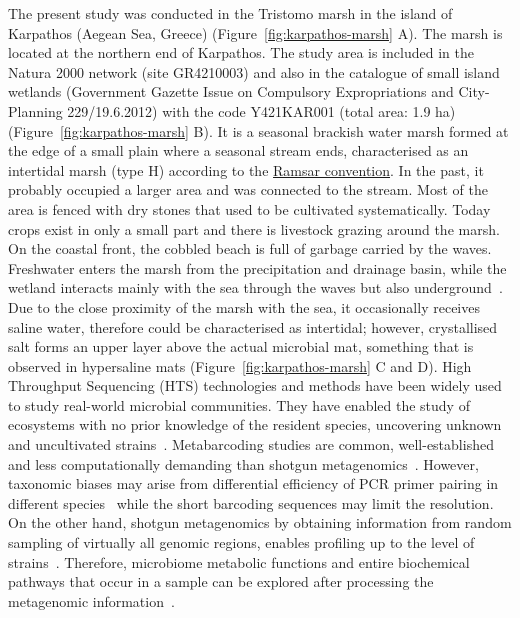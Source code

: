    The present study was conducted in the Tristomo marsh in the island of Karpathos (Aegean Sea, Greece) (Figure~\ref{fig:karpathos-marsh} A). 
   The marsh is located at the northern end of Karpathos. 
   The study area is included in the Natura 2000 network (site GR4210003) and also in the catalogue of small island wetlands 
   (Government Gazette Issue on Compulsory Expropriations and City-Planning 229/19.6.2012) with the code Y421KAR001 (total area: 1.9 ha) (Figure~\ref{fig:karpathos-marsh} B). 
   It is a seasonal brackish water marsh formed at the edge of a small plain where a seasonal stream ends, 
   characterised as an intertidal marsh (type H) according to the \href{https://www.ramsar.org/about/the-convention-on-wetlands-and-its-mission}{Ramsar convention}. 
   In the past, it probably occupied a larger area and was connected to the stream. 
   Most of the area is fenced with dry stones that used to be cultivated systematically. 
   Today crops exist in only a small part and there is livestock grazing around the marsh. 
   On the coastal front, the cobbled beach is full of garbage carried by the waves. 
   Freshwater enters the marsh from the precipitation and drainage basin, while the wetland interacts mainly with the sea through the waves 
   but also underground~\citep{wwf_greece_inventory_2022}. 
   Due to the close proximity of the marsh with the sea, it occasionally receives saline water, therefore could be characterised as intertidal; 
   however, crystallised salt forms an upper layer above the actual microbial mat, something that is observed in hypersaline mats (Figure~\ref{fig:karpathos-marsh} C and D). 
   High Throughput Sequencing (HTS) technologies and methods have been widely used to study real-world microbial communities. 
   They have enabled the study of ecosystems with no prior knowledge of the resident species, uncovering unknown and uncultivated strains~\citep{hedlund_impact_2014}. 
   Metabarcoding studies are common, well-established and less computationally demanding than shotgun metagenomics~\citep{bell_comparing_2021}. 
   However, taxonomic biases may arise from differential efficiency of PCR primer pairing in different species~\citep{van_der_loos_biases_2021}
   while the short barcoding sequences may limit the resolution. 
   On the other hand, shotgun metagenomics by obtaining information from random sampling of virtually all genomic regions, 
   enables profiling up to the level of strains~\citep{clooney_comparing_2016, segata_road_2018, davila-ramos_review_2019}. 
   Therefore, microbiome metabolic functions and entire biochemical pathways that occur in a sample can be explored after processing 
   the metagenomic information~\citep{sharpton_introduction_2014}. 

